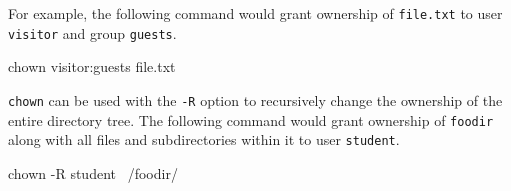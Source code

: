 For example, the following command would grant ownership of \verb|file.txt| to user \verb|visitor| and group \verb|guests|.

\begin{commandshell}
chown visitor:guests file.txt
\end{commandshell}

\verb|chown| can be used with the \verb|-R| option to recursively change the ownership of the entire directory tree. The following command would grant ownership of \verb|foodir| along with all files and subdirectories within it to user \verb|student|.

\begin{commandshell}
chown -R student ~/foodir/
\end{commandshell}

